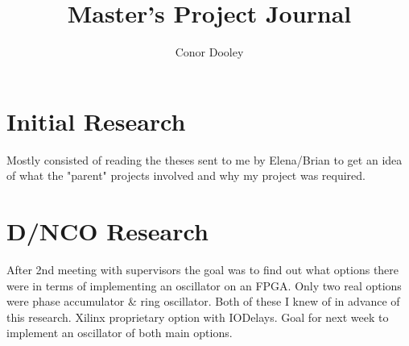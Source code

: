 \documentclass[a4paper,12pt]{report}
\begin{document}
\title{Master's Project Journal}
\author{Conor Dooley}
\maketitle
\section*{Initial Research}
Mostly consisted of reading the theses sent to me by Elena/Brian to get an idea of what the "parent" projects involved and why my project was required.
\section*{D/NCO Research}
After 2nd meeting with supervisors the goal was to find out what options there were in terms of implementing an oscillator on an FPGA. Only two real options were phase accumulator \& ring oscillator. Both of these I knew of in advance of this research. Xilinx proprietary option with IODelays. Goal for next week to implement an oscillator of both main options.
\end{document}
